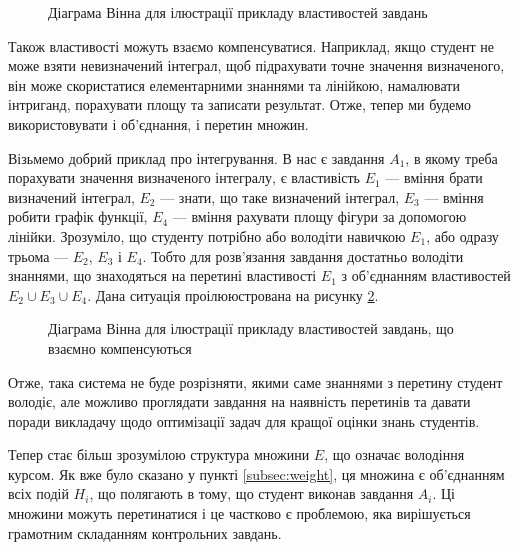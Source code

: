 \begin{figure}[h]
  \center
  \caption{Діаграма Вінна для ілюстрації прикладу властивостей завдань}
  \label{fig:tikz:tasksPropertiesVenn}
\end{figure}

Також властивості можуть взаємо компенсуватися.
Наприклад, якщо студент не може взяти невизначений інтеграл, щоб підрахувати
точне значення визначеного, він може скористатися елементарними знаннями та
лінійкою, намалювати інтриганд, порахувати площу та записати результат.
Отже, тепер ми будемо використовувати і об’єднання, і перетин множин.

Візьмемо добрий приклад про інтегрування.
В нас є завдання $A_1$, в якому треба порахувати значення визначеного інтегралу,
є властивість $E_1$ --- вміння брати визначений інтеграл,
$E_2$ --- знати, що таке визначений інтеграл, $E_3$ --- вміння робити графік
функції, $E_4$ --- вміння рахувати площу фігури за допомогою лінійки.
Зрозуміло, що студенту потрібно або володіти навичкою $E_1$, або одразу трьома
--- $E_2$, $E_3$ і $E_4$.
Тобто для розв’язання завдання достатньо володіти знаннями, що знаходяться на
перетині властивості $E_1$ з об’єднанням властивостей $E_2 \cup E_3 \cup E_4$.
Дана ситуація проілююстрована на рисунку
\ref{fig:tikz:tasksPropertiesAdvancedVenn}.

\begin{figure}[h]
  \center
  \caption{Діаграма Вінна для ілюстрації прикладу властивостей завдань,
    що взаємно компенсуються}
  \label{fig:tikz:tasksPropertiesAdvancedVenn}
\end{figure}

Отже, така система не буде розрізняти, якими саме знаннями з перетину студент
володіє, але можливо проглядати завдання на наявність перетинів та давати
поради викладачу щодо оптимізації задач для кращої оцінки знань студентів.

Тепер стає більш зрозумілою структура множини $E$, що означає володіння курсом.
Як вже було сказано у пункті \ref{subsec:weight}, ця множина є об’єднанням всіх
подій $H_i$, що полягають в тому, що студент виконав завдання $A_i$.
Ці множини можуть перетинатися і це частково є проблемою, яка вирішується
грамотним складанням контрольних завдань.

